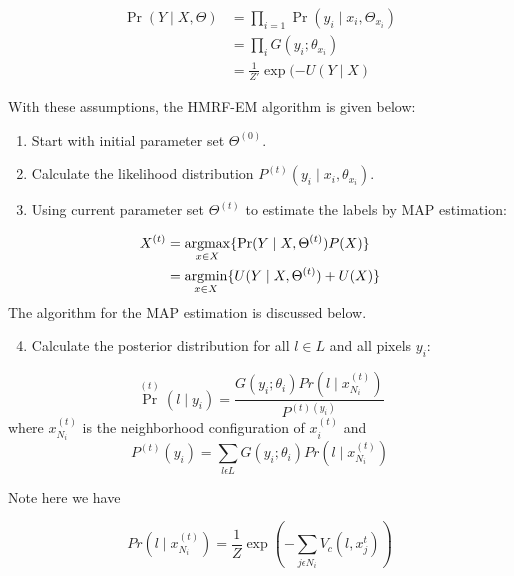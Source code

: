 \begin{equation}\label{eq2}
\begin{split}
\Pr( Y \mid X,\Theta) & =\prod_{i=1}^{ }\Pr( y_i \mid x_i,\Theta_{x_i})\\
& =\prod_{i}^{ }G(y_i;\theta_{x_i})\\
& =\frac{1}{Z'}\exp{(-U(Y \mid X)} 
\end{split}
\end{equation}

With these assumptions, the HMRF-EM algorithm is given below:

\begin{enumerate}
	\item Start with initial parameter set \(\Theta^{(0)}\).
	\item Calculate the likelihood distribution \(P^{(t)}(y_i \mid x_i,\theta_{x_i})\).
	\item Using current parameter set \(\Theta^{(t)}\) to estimate the labels
	by MAP estimation:
\end{enumerate}

\begin{equation}
\begin{split}
X^{(t)} & =\operatorname*{argmax}_{x \in X}\{\Pr( Y \mid X, \Theta^{(t)})P(X)\}\\
&= \operatorname*{argmin}_{x \in X} \{U( Y \mid X, \Theta^{(t)}) + U(X)\}
\end{split}
\end{equation}
The algorithm for the MAP estimation is discussed below.

\begin{enumerate}
	\setcounter{enumi}{3}
	\item Calculate the posterior distribution for all  \(l \in L\) and  all pixels \(y_i\):
\end{enumerate}
\begin{equation}
\Pr^{(t)}(l \mid y_i)=\frac{G(y_i;\theta_i)Pr(l \mid x^{(t)}_{N_i})}{P^{(t)(y_i)}}
\end{equation}
where \(x^{(t)}_{N_i}\) is the neighborhood configuration of \(x^{(t)}_i\)
and
\begin{equation}
P^{(t)}(y_i)={\sum\limits_{l \epsilon L} }G(y_i;\theta_i)Pr(l \mid x^{(t)}_{N_i})
\end{equation}

Note here we have

\begin{equation}
Pr(l \mid x^{(t)}_{N_i})=\frac{1}{Z}\exp(-{\sum\limits_{j \epsilon N_i}}V_c(l,x^t_j))
\end{equation}

